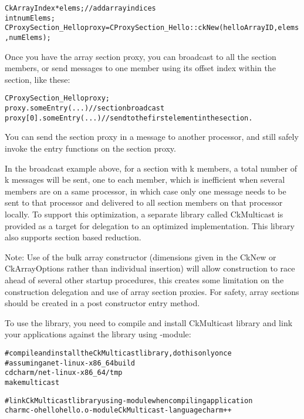 \begin{alltt}
  CkArrayIndex *elems;    // add array indices
  int numElems;
  CProxySection_Hello proxy = CProxySection_Hello::ckNew(helloArrayID, elems, numElems);
\end{alltt}

Once you have the array section proxy, you can broadcast to all the 
section members, or send messages to one member using its offset index within the section, like these:

\begin{alltt}
  CProxySection_Hello proxy;
  proxy.someEntry(...)          // section broadcast
  proxy[0].someEntry(...)       // send to the first element in the section.
\end{alltt}

You can send the section proxy in a message to another processor, and still 
safely invoke the entry functions on the section proxy.

In the broadcast example above, for a section with k members, a total
number of k messages will be sent, one to each member, which is
inefficient when several members are on a same processor, in which
case only one message needs to be sent to that processor and delivered
to all section members on that processor locally. To support this
optimization, a separate library called CkMulticast is provided as a
target for delegation to an optimized implementation. This library
also supports section based reduction.

Note: Use of the bulk array constructor (dimensions given in the CkNew
or CkArrayOptions rather than individual insertion) will allow
construction to race ahead of several other startup procedures, this
creates some limitation on the construction delegation and use of
array section proxies.  For safety, array sections should be
created in a post constructor entry method.

\label {array_section_multicast}

To use the library, you need to compile and install CkMulticast library and 
link your applications against the library using -module:

\begin{alltt}
  # compile and install the CkMulticast library, do this only once
  # assuming a net-linux-x86\_64 build
  cd charm/net-linux-x86\_64/tmp
  make multicast

  # link CkMulticast library using -module when compiling application
  charmc  -o hello hello.o -module CkMulticast -language charm++ 
\end{alltt}

